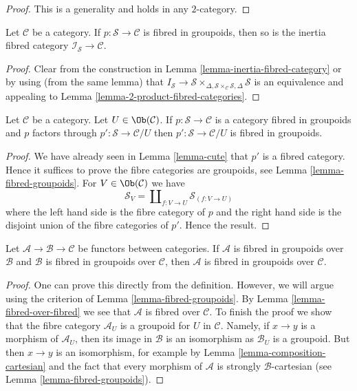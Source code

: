 \begin{proof}
This is a generality and holds in any $2$-category.
\end{proof}

\begin{lemma}
\label{lemma-inertia-fibred-groupoids}
Let $\mathcal{C}$ be a category.
If $p : \mathcal{S} \to \mathcal{C}$ is fibred in groupoids, then
so is the inertia fibred category $\mathcal{I}_\mathcal{S} \to \mathcal{C}$.
\end{lemma}

\begin{proof}
Clear from the construction in
Lemma \ref{lemma-inertia-fibred-category}
or by using (from the same lemma) that
$I_\mathcal{S} \to \mathcal{S}
\times_{\Delta, \mathcal{S} \times_\mathcal{C} \mathcal{S}, \Delta}\mathcal{S}$
is an equivalence and appealing to
Lemma \ref{lemma-2-product-fibred-categories}.
\end{proof}

\begin{lemma}
\label{lemma-cute-groupoids}
Let $\mathcal{C}$ be a category. Let $U \in \Ob(\mathcal{C})$.
If $p : \mathcal{S} \to \mathcal{C}$ is a category fibred in groupoids
and $p$ factors through $p' : \mathcal{S} \to \mathcal{C}/U$
then $p' : \mathcal{S} \to \mathcal{C}/U$ is fibred in groupoids.
\end{lemma}

\begin{proof}
We have already seen in Lemma \ref{lemma-cute} that $p'$ is a fibred
category. Hence it suffices to prove the fibre categories are groupoids,
see Lemma \ref{lemma-fibred-groupoids}.
For $V \in \Ob(\mathcal{C})$ we have
$$
\mathcal{S}_V = \coprod\nolimits_{f : V \to U} \mathcal{S}_{(f : V \to U)}
$$
where the left hand side is the fibre category of $p$ and the right hand side
is the disjoint union of the fibre categories of $p'$.
Hence the result.
\end{proof}

\begin{lemma}
\label{lemma-fibred-in-groupoids-over-fibred-in-groupoids}
Let $\mathcal{A} \to \mathcal{B} \to \mathcal{C}$ be functors between
categories. If $\mathcal{A}$ is fibred in groupoids over $\mathcal{B}$
and $\mathcal{B}$ is fibred in groupoids over $\mathcal{C}$, then
$\mathcal{A}$ is fibred in groupoids over $\mathcal{C}$.
\end{lemma}

\begin{proof}
One can prove this directly from the definition. However, we will argue
using the criterion of Lemma \ref{lemma-fibred-groupoids}.
By Lemma \ref{lemma-fibred-over-fibred} we see that $\mathcal{A}$
is fibred over $\mathcal{C}$. To finish the proof we show that the fibre
category $\mathcal{A}_U$ is a groupoid for $U$ in $\mathcal{C}$.
Namely, if $x \to y$ is a morphism of $\mathcal{A}_U$, then its
image in $\mathcal{B}$ is an isomorphism as $\mathcal{B}_U$ is
a groupoid. But then $x \to y$ is an isomorphism, for example by
Lemma \ref{lemma-composition-cartesian} and the fact that every
morphism of $\mathcal{A}$ is strongly $\mathcal{B}$-cartesian
(see Lemma \ref{lemma-fibred-groupoids}).
\end{proof}


